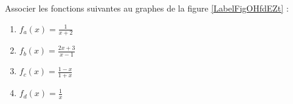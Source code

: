 
\begin{exercice}\label{exosmath-0334}

    Associer les fonctions suivantes au graphes de la figure \ref{LabelFigOHfdEZt} :


%

\begin{center}
   
\end{center}

\let\Oldtheenumi\theenumi
\renewcommand{\theenumi}{(\alph{enumi})}
\begin{multicols}{2}
    \begin{enumerate}
        \item
            \( f_a(x)=\frac{1}{ x+2 }\)
        \item
            \( f_b(x)=\frac{ 2x+3 }{ x-1 }\)
        \item
            \( f_c(x)=\frac{ 1-x }{ 1+x }\)
        \item
            \( f_d(x)=\frac{ 1 }{ x }\)
    \end{enumerate}
\end{multicols}
\let\theenumi\Oldtheenumi

\end{exercice}
